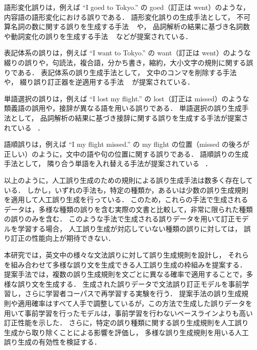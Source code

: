 \documentclass[
  platex, dvipdfmx %
]{nlp2021}
\begin{document}
語形変化誤りは，例えば ``I goed to Tokyo.'' の goed（訂正は went）のような，内容語の語形変化における誤りである．
語形変化誤りの生成手法として，
不可算名詞の数に関する誤りを生成する手法 ~\cite{brockett-etal-2006-correcting} や，
品詞解析の結果に基づき名詞数や動詞変化の誤りを生成する手法 ~\cite{choe-etal-2019-neural} などが提案されている．

表記体系の誤りは，例えば ``I want to Tokyo.'' の want（訂正は went）のような綴りの誤りや，句読法，複合語，分かち書き，縮約，大小文字の規則に関する誤りである．
表記体系の誤り生成手法として，
文中のコンマを削除する手法 ~\cite{flachs-etal-2019-noisy} や，
綴り誤り訂正器を逆適用する手法 ~\cite{grundkiewicz-etal-2019-neural} が提案されている．

単語選択の誤りは，例えば ``I lost my flight.'' の lost（訂正は missed）のような類義語の誤用や，接辞が異なる語を用いる誤りである．
単語選択の誤り生成手法として，
品詞解析の結果に基づき接辞に関する誤りを生成する手法が提案されている ~\cite{xu-etal-2019-erroneous}．

語順誤りは，例えば ``I my flight missed.'' の my flight の位置（missed の後ろが正しい）のように，文中の語や句の位置に関する誤りである．
語順誤りの生成手法として，
隣り合う単語を入れ替える手法が提案されている ~\cite{inproceedings000,grundkiewicz-etal-2019-neural}．

以上のように，人工誤り生成のための規則による誤り生成手法は数多く存在している．
しかし，いずれの手法も，特定の種類か，あるいは少数の誤り生成規則を適用して人工誤り生成を行っている．
このため，これらの手法で生成されるデータは，多様な種類の誤りを含む実際の文書と比較して，非常に限られた種類の誤りのみを含む．
このような手法で生成される誤りデータを用いて訂正モデルを学習する場合，
人工誤り生成が対応していない種類の誤りに対しては，
誤り訂正の性能向上が期待できない．

本研究では，英文中の様々な文法誤りに対して誤り生成規則を設計し，
それらを組み合わせて多様な誤り文を生成できる人工誤り生成の枠組みを提案する．
提案手法では，複数の誤り生成規則を文ごとに異なる確率で適用することで，多様な誤り文を生成する．
生成された誤りデータで文法誤り訂正モデルを事前学習し，さらに学習者コーパスで再学習する実験を行う．
提案手法の誤り生成規則や適用確率はすべて人手で調整しているが，この方法で生成した誤りデータを用いて事前学習を行ったモデルは，事前学習を行わないベースラインよりも高い訂正性能を示した．
さらに，特定の誤り種類に関する誤り生成規則を人工誤り生成から取り除くことによる影響を評価し，
多様な誤り生成規則を用いる人工誤り生成の有効性を検証する．
\end{document}
